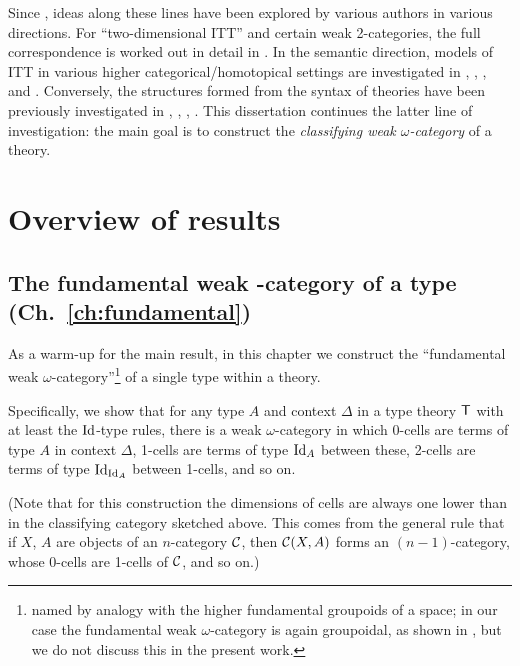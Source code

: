 \begin{para}
Since \cite{hofmann-streicher}, ideas along these lines have been explored by various authors in various directions.  For ``two-dimensional ITT'' and certain weak 2-categories, the full correspondence is worked out in detail in \cite{garner:2-d-models}.  In the semantic direction, models of ITT in various higher categorical/homotopical settings are investigated in \cite{awodey-warren}, \cite{warren:thesis}, \cite{garner-van-den-berg:top-and-simp-models}, and \cite{voevodsky:univalent-notes}.  Conversely, the structures formed from the syntax of theories have been previously investigated in \cite{gambino-garner}, \cite{lumsdaine:weak-w-cats-from-itt-lmcs}, \cite{garner-van-den-berg}, \cite{awodey-hofstra-warren}.  This dissertation continues the latter line of investigation: the main goal is to construct the \emph{classifying weak $\omega$-category} of a theory.
\end{para}


\section{Overview of results}

\subsection*{The fundamental weak \pdfomega-category of a type (Ch.~\ref{ch:fundamental})}

\begin{para} \label{para:fundamental-sketch} As a warm-up for the main result, in this chapter we construct the ``fundamental weak $\omega$-category''\footnote{named by analogy with the higher fundamental groupoids of a space; in our case the fundamental weak $\omega$-category is again groupoidal, as shown in \cite{garner-van-den-berg}, but we do not discuss this in the present work.} of a single type within a theory.  

Specifically, we show that for any type $A$ and context $\Delta$ in a type theory $\mathsf{T}$ with at least the $\mathrm{Id}$-type rules, there is a weak $\omega$-category in which 0-cells are terms of type $A$ in context $\Delta$, 1-cells are terms of type $\mathrm{Id}_A$ between these, 2-cells are terms of type $\mathrm{Id}_{\mathrm{Id}_A}$ between 1-cells, and so on.

(Note that for this construction the dimensions of cells are always one lower than in the classifying category sketched above.  This comes from the general rule that if $X$, $A$ are objects of an $n$-category $\mathcal{C}$, then $\mathcal{C}(X,A)$ forms an $(n-1)$-category, whose 0-cells are 1-cells of $\mathcal{C}$, and so on.)
\end{para}

